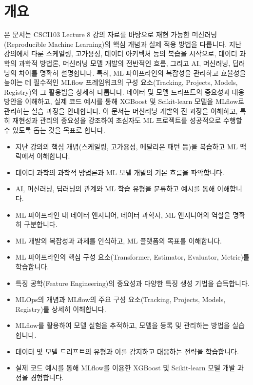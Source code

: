 \documentclass[11pt,a4paper]{article}
\begin{document}
\newpage
\section*{개요}
본 문서는 CSCI103 Lecture 8 강의 자료를 바탕으로 재현 가능한 머신러닝(Reproducible Machine Learning)의 핵심 개념과 실제 적용 방법을 다룹니다. 지난 강의에서 다룬 스케일링, 고가용성, 데이터 아키텍처 등의 복습을 시작으로, 데이터 과학의 과학적 방법론, 머신러닝 모델 개발의 전반적인 흐름, 그리고 AI, 머신러닝, 딥러닝의 차이를 명확히 설명합니다. 특히, ML 파이프라인의 복잡성을 관리하고 효율성을 높이는 데 필수적인 MLflow 프레임워크의 구성 요소(Tracking, Projects, Models, Registry)와 그 활용법을 상세히 다룹니다. 데이터 및 모델 드리프트의 중요성과 대응 방안을 이해하고, 실제 코드 예시를 통해 XGBoost 및 Scikit-learn 모델을 MLflow로 관리하는 실습 과정을 안내합니다. 이 문서는 머신러닝 개발의 전 과정을 이해하고, 특히 재현성과 관리의 중요성을 강조하여 초심자도 ML 프로젝트를 성공적으로 수행할 수 있도록 돕는 것을 목표로 합니다.

\begin{tcolorbox}[summarybox={주요 학습 목표}]
\begin{itemize}
    \item 지난 강의의 핵심 개념(스케일링, 고가용성, 메달리온 패턴 등)을 복습하고 ML 맥락에서 이해합니다.
    \item 데이터 과학의 과학적 방법론과 ML 모델 개발의 기본 흐름을 파악합니다.
    \item AI, 머신러닝, 딥러닝의 관계와 ML 학습 유형을 분류하고 예시를 통해 이해합니다.
    \item ML 파이프라인 내 데이터 엔지니어, 데이터 과학자, ML 엔지니어의 역할을 명확히 구분합니다.
    \item ML 개발의 복잡성과 과제를 인식하고, ML 플랫폼의 목표를 이해합니다.
    \item ML 파이프라인의 핵심 구성 요소(Transformer, Estimator, Evaluator, Metric)를 학습합니다.
    \item 특징 공학(Feature Engineering)의 중요성과 다양한 특징 생성 기법을 습득합니다.
    \item MLOps의 개념과 MLflow의 주요 구성 요소(Tracking, Projects, Models, Registry)를 상세히 이해합니다.
    \item MLflow를 활용하여 모델 실험을 추적하고, 모델을 등록 및 관리하는 방법을 실습합니다.
    \item 데이터 및 모델 드리프트의 유형과 이를 감지하고 대응하는 전략을 학습합니다.
    \item 실제 코드 예시를 통해 MLflow를 이용한 XGBoost 및 Scikit-learn 모델 개발 과정을 경험합니다.
\end{itemize}
\end{tcolorbox}
\end{document}
